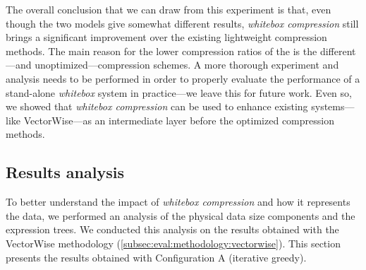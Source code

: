 The overall conclusion that we can draw from this experiment is that, even though the two models give somewhat different results, \textit{whitebox compression} still brings a significant improvement over the existing lightweight compression methods. The main reason for the lower compression ratios of the  is the different---and unoptimized---compression schemes. A more thorough experiment and analysis needs to be performed in order to properly evaluate the performance of a stand-alone \textit{whitebox} system in practice---we leave this for future work. Even so, we showed that \textit{whitebox compression} can be used to enhance existing systems---like VectorWise---as an intermediate layer before the optimized compression methods.



\subsection{Results analysis}
\label{subsec:eval:results:analysis}

To better understand the impact of \textit{whitebox compression} and how it represents the data, we performed an analysis of the physical data size components and the expression trees. We conducted this analysis on the results obtained with the VectorWise methodology (\ref{subsec:eval:methodology:vectorwise}). This section presents the results obtained with Configuration A (iterative greedy).

